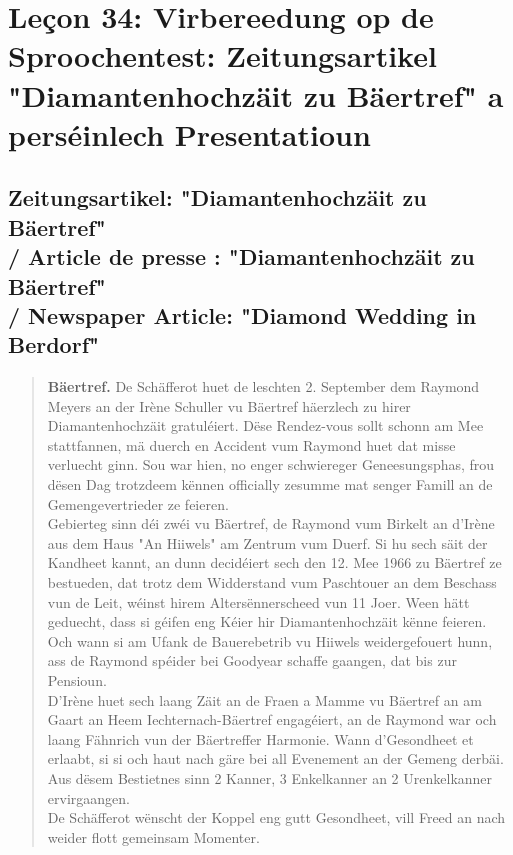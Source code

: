 \chapter[Leçon 34: Zeitungsartikel "Diamantenhochzäit"]{Leçon 34: Virbereedung op de Sproochentest: Zeitungsartikel "Diamantenhochzäit zu Bäertref" a perséinlech Presentatioun}

\section[Zeitungsartikel / Newspaper Article]{Zeitungsartikel: "Diamantenhochzäit zu Bäertref" \\/ Article de presse : "Diamantenhochzäit zu Bäertref" \\/ Newspaper Article: "Diamond Wedding in Berdorf"}

\begin{quote}
\textbf{Bäertref.} De Schäfferot huet de leschten 2. September dem Raymond Meyers an der Irène Schuller vu Bäertref häerzlech zu hirer Diamantenhochzäit gratuléiert. Dëse Rendez-vous sollt schonn am Mee stattfannen, mä duerch en Accident vum Raymond huet dat misse verluecht ginn. Sou war hien, no enger schwiereger Geneesungsphas, frou dësen Dag trotzdeem kënnen officially zesumme mat senger Famill an de Gemengevertrieder ze feieren.\\
Gebierteg sinn déi zwéi vu Bäertref, de Raymond vum Birkelt an d'Irène aus dem Haus "An Hiiwels" am Zentrum vum Duerf. Si hu sech säit der Kandheet kannt, an dunn decidéiert sech den 12. Mee 1966 zu Bäertref ze bestueden, dat trotz dem Widderstand vum Paschtouer an dem Beschass vun de Leit, wéinst hirem Altersënnerscheed vun 11 Joer. Ween hätt geduecht, dass si géifen eng Kéier hir Diamantenhochzäit kënne feieren. Och wann si am Ufank de Bauerebetrib vu Hiiwels weidergefouert hunn, ass de Raymond spéider bei Goodyear schaffe gaangen, dat bis zur Pensioun.\\
D'Irène huet sech laang Zäit an de Fraen a Mamme vu Bäertref an am Gaart an Heem Iechternach-Bäertref engagéiert, an de Raymond war och laang Fähnrich vun der Bäertreffer Harmonie. Wann d'Gesondheet et erlaabt, si si och haut nach gäre bei all Evenement an der Gemeng derbäi. Aus dësem Bestietnes sinn 2 Kanner, 3 Enkelkanner an 2 Urenkelkanner ervirgaangen.\\
De Schäfferot wënscht der Koppel eng gutt Gesondheet, vill Freed an nach weider flott gemeinsam Momenter.
\end{quote}

